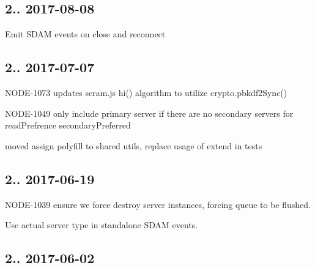 \subsection*{2.. 2017-\/08-\/08 }


\begin{DoxyItemize}
\item Emit S\+D\+AM events on close and reconnect
\end{DoxyItemize}

\subsection*{2.. 2017-\/07-\/07 }


\begin{DoxyItemize}
\item N\+O\+D\+E-\/1073 updates scram.\+js hi() algorithm to utilize crypto.\+pbkdf2\+Sync()
\item N\+O\+D\+E-\/1049 only include primary server if there are no secondary servers for read\+Prefrence secondary\+Preferred
\item moved {\ttfamily assign} polyfill to shared utils, replace usage of {\ttfamily extend} in tests
\end{DoxyItemize}

\subsection*{2.. 2017-\/06-\/19 }


\begin{DoxyItemize}
\item N\+O\+D\+E-\/1039 ensure we force destroy server instances, forcing queue to be flushed.
\item Use actual server type in standalone S\+D\+AM events.
\end{DoxyItemize}

\subsection*{2.. 2017-\/06-\/02 }


